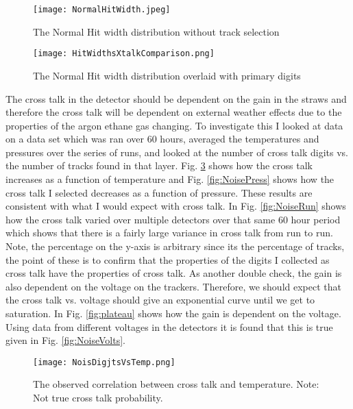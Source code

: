 \documentclass[./Thesis]{subfiles}
\begin{document}
\begin{figure}
	\centerline{\texttt{[image: NormalHitWidth.jpeg]}}
	\caption[ HitWidth]{ The Normal Hit width distribution without track selection}
	\label{fig:hitWidth}
\end{figure}


\begin{figure}
	\centerline{\texttt{[image: HitWidthsXtalkComparison.png]}}
	\caption[ HitWidth with cross talk and primary digits]{ The Normal Hit width distribution overlaid with primary digits }
	\label{fig:hitWidthAll}
\end{figure}

	
	
	 The cross talk in the detector should be dependent on the gain in the straws and therefore the cross talk will be dependent on external weather effects due to the properties of the argon ethane gas changing. To investigate this I looked at data on a data set which was ran over 60 hours, averaged the temperatures and pressures over the series of runs, and looked at the number of cross talk digits vs. the number of tracks found in that layer. Fig. \ref{fig:NoiseTemp} shows how the cross talk increases as a function of temperature and Fig. \ref{fig:NoisePress} shows how the cross talk I selected decreases as a function of pressure. These results are consistent with what I would expect with cross talk. In Fig. \ref{fig:NoiseRun} shows how the cross talk varied over multiple detectors over that same 60 hour period which shows that there is a fairly large variance in cross talk from run to run. Note, the percentage on the y-axis is arbitrary since its the percentage of tracks, the point of these is to confirm that the properties of the digits I collected as cross talk have the properties of cross talk.  As another double check, the gain is also dependent on the voltage on the trackers. Therefore, we should expect that the cross talk vs. voltage should give an exponential curve until we get to saturation. In Fig. \ref{fig:plateau} shows how the gain is dependent on the voltage. Using data from different voltages in the detectors it is found that this is true given in Fig. \ref{fig:NoiseVolts}.
	
	
	
\begin{figure}
	\centerline{\texttt{[image: NoisDigjtsVsTemp.png]}}
	\caption[ Cross Talk Vs. Temperature]{ The observed correlation between cross talk and temperature. Note: Not true cross talk probability.}
	\label{fig:NoiseTemp}
\end{figure}
\end{document}
